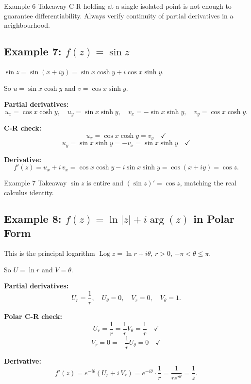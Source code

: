 \documentclass[12pt,a4paper]{article}
\begin{document}
\begin{learnbox}{Example 6 Takeaway}
C-R holding at a single isolated point is not enough to guarantee differentiability. Always verify continuity of partial derivatives in a neighbourhood.
\end{learnbox}

\subsection*{Example 7: $f(z) = \sin z$}

$\sin z = \sin(x+iy) = \sin x\cosh y + i\cos x\sinh y$.

So $u = \sin x \cosh y$ and $v = \cos x \sinh y$.

\textbf{Partial derivatives:}
\[
  u_x = \cos x\cosh y, \quad u_y = \sin x\sinh y,
  \quad v_x = -\sin x\sinh y, \quad v_y = \cos x\cosh y.
\]

\textbf{C-R check:}
\[
  u_x = \cos x\cosh y = v_y \quad \checkmark
\]
\[
  u_y = \sin x\sinh y = -v_x = \sin x\sinh y \quad \checkmark
\]

\textbf{Derivative:}
\[
  f'(z) = u_x + i\,v_x = \cos x\cosh y - i\sin x\sinh y = \cos(x+iy) = \cos z.
\]

\begin{learnbox}{Example 7 Takeaway}
$\sin z$ is entire and $(\sin z)' = \cos z$, matching the real calculus identity.
\end{learnbox}

\subsection*{Example 8: $f(z) = \ln|z| + i\arg(z)$ in Polar Form}

This is the principal logarithm $\operatorname{Log} z = \ln r + i\theta$, $r > 0$, $-\pi < \theta \leq \pi$.

So $U = \ln r$ and $V = \theta$.

\textbf{Partial derivatives:}
\[
  U_r = \frac{1}{r}, \quad U_\theta = 0, \quad V_r = 0, \quad V_\theta = 1.
\]

\textbf{Polar C-R check:}
\[
  U_r = \frac{1}{r} = \frac{1}{r}V_\theta = \frac{1}{r} \quad \checkmark
\]
\[
  V_r = 0 = -\frac{1}{r}U_\theta = 0 \quad \checkmark
\]

\textbf{Derivative:}
\[
  f'(z) = e^{-i\theta}(U_r + i\,V_r) = e^{-i\theta}\cdot\frac{1}{r} = \frac{1}{re^{i\theta}} = \frac{1}{z}.
\]
\end{document}
